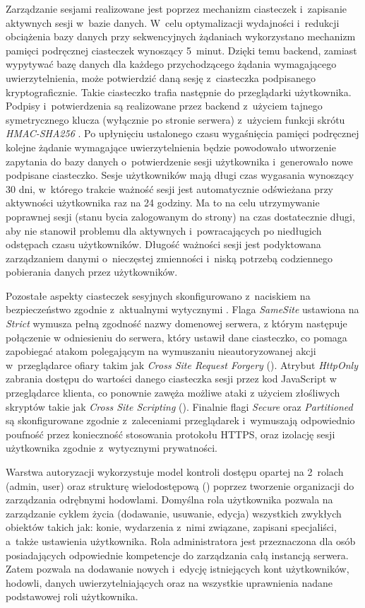 Zarządzanie sesjami realizowane jest poprzez mechanizm ciasteczek i~zapisanie aktywnych sesji w~bazie danych. W~celu optymalizacji wydajności i~redukcji obciążenia bazy danych przy sekwencyjnych żądaniach wykorzystano mechanizm pamięci podręcznej ciasteczek wynoszący 5~minut. Dzięki temu backend, zamiast wypytywać bazę danych dla każdego przychodzącego żądania wymagającego uwierzytelnienia, może potwierdzić daną sesję z~ciasteczka podpisanego kryptograficznie. Takie ciasteczko trafia następnie do przeglądarki użytkownika. Podpisy i~potwierdzenia są realizowane przez backend z~użyciem tajnego symetrycznego klucza (wyłącznie po stronie serwera) z~użyciem funkcji skrótu \emph{HMAC-SHA256} \cite{better_auth_cache}. Po upłynięciu ustalonego czasu wygaśnięcia pamięci podręcznej kolejne żądanie wymagające uwierzytelnienia będzie powodowało utworzenie zapytania do bazy danych o~potwierdzenie sesji użytkownika i~generowało nowe podpisane ciasteczko. Sesje użytkowników mają długi czas wygasania wynoszący 30 dni, w~którego trakcie ważność sesji jest automatycznie odświeżana przy aktywności użytkownika raz na 24 godziny. Ma to na celu utrzymywanie poprawnej sesji (stanu bycia zalogowanym do strony) na czas dostatecznie długi, aby nie stanowił problemu dla aktywnych i~powracających po niedługich odstępach czasu użytkowników. Długość ważności sesji jest podyktowana zarządzaniem danymi o~nieczęstej zmienności i~niską potrzebą codziennego pobierania danych przez użytkowników.

Pozostałe aspekty ciasteczek sesyjnych skonfigurowano z~naciskiem na bezpieczeństwo zgodnie z~aktualnymi wytycznymi \cite{mdn_cookie}. Flaga \emph{SameSite} ustawiona na \emph{Strict} wymusza pełną zgodność nazwy domenowej serwera, z którym następuje połączenie w odniesieniu do serwera, który ustawił dane ciasteczko, co pomaga zapobiegać atakom polegającym na wymuszaniu nieautoryzowanej akcji w~przeglądarce ofiary takim jak \emph{Cross Site Request Forgery} (). Atrybut \emph{HttpOnly} zabrania dostępu do wartości danego ciasteczka sesji przez kod JavaScript w przeglądarce klienta, co ponownie zawęża możliwe ataki z użyciem złośliwych skryptów takie jak \emph{Cross Site Scripting} (). Finalnie flagi \emph{Secure} oraz \emph{Partitioned} są skonfigurowane zgodnie z~zaleceniami przeglądarek i~wymuszają odpowiednio poufność przez konieczność stosowania protokołu HTTPS, oraz izolację sesji użytkownika zgodnie z~wytycznymi prywatności.

Warstwa autoryzacji wykorzystuje model kontroli dostępu opartej na 2~rolach (admin, user) oraz strukturę wielodostępową () poprzez tworzenie organizacji do zarządzania odrębnymi hodowlami. Domyślna rola użytkownika pozwala na zarządzanie cyklem życia (dodawanie, usuwanie, edycja) wszystkich zwykłych obiektów takich jak: konie, wydarzenia z~nimi związane, zapisani specjaliści, a~także ustawienia użytkownika. Rola administratora jest przeznaczona dla osób posiadających odpowiednie kompetencje do zarządzania całą instancją serwera. Zatem pozwala na dodawanie nowych i~edycję istniejących kont użytkowników, hodowli, danych uwierzytelniających oraz na wszystkie uprawnienia nadane podstawowej roli użytkownika. 

